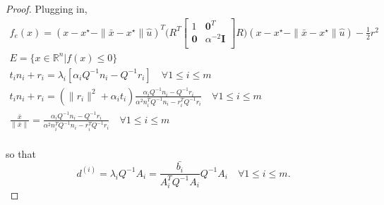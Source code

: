 \begin{proof}
Plugging in,
\begin{align*}
f_e(x) = (x - x^{\star} - \|\bar x - x^{\star} \|\hat u)^T\bigg(R^T\begin{bmatrix}
1 & \boldsymbol0^T \\
\boldsymbol 0 & \alpha^{-2} \boldsymbol I \\
\end{bmatrix}R\bigg)(x - x^{\star} - \|\bar x - x^{\star} \|\hat u) - \frac 1 2 r^2 \\
E = \{x \in \mathbb R^n | f(x) \le 0\} \\
t_in_i + r_i = \lambda_i \left[\alpha_i Q^{-1} n_i - Q^{-1}r_i \right] \quad \forall 1\le i\le m \\
t_in_i + r_i = (\|r_i\|^2  + \alpha_i t_i)\frac{\alpha_i Q^{-1} n_i - Q^{-1}r_i}{\alpha^2 n_i^TQ^{-1} n_i - r_i^T Q^{-1}r_i} \quad \forall 1\le i\le m \\
\frac{\bar x}{\|\bar x\|} = \frac{\alpha_i Q^{-1} n_i - Q^{-1}r_i}{\alpha^2 n_i^TQ^{-1} n_i - r_i^T Q^{-1}r_i} \quad \forall 1\le i\le m \\
\end{align*}


so that 
\[
d^{(i)} = \lambda_i Q^{-1}A_i = \frac {\bar{b_i}}{A_i^T  Q^{-1}A_i}  Q^{-1}A_i \quad \forall 1\le i\le m.
\]


\end{proof}
